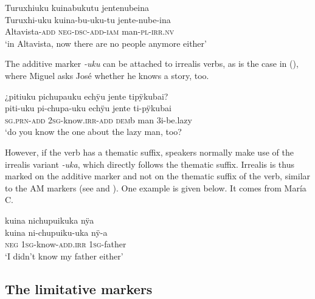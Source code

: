 \ea\label{ex:ADD-nonverbal}
\begingl
\glpreamble Turuxhiuku kuinabukutu jentenubeina\\
\gla Turuxhi-uku kuina-bu-uku-tu jente-nube-ina\\
\glb Altavista-\textsc{add} \textsc{neg}-\textsc{dsc}-\textsc{add}-\textsc{iam} man-\textsc{pl}-\textsc{irr.nv}\\
\glft ‘in Altavista, now there are no people anymore either’
\endgl
\trailingcitation{[mty-p110906l.170]}
\xe

The additive marker \textit{-uku} can be attached to irrealis verbs, as is the case in (), where Miguel asks José whether he knows a story, too.

\ea\label{ex:know-too}
\begingl
\glpreamble ¿pitiuku pichupauku echÿu jente tipÿkubai?\\
\gla piti-uku pi-chupa-uku echÿu jente ti-pÿkubai\\
\textsc{sg.prn}-\textsc{add} 2\textsc{sg}-know.\textsc{irr}-\textsc{add} \textsc{dem}b man 3i-be.lazy\\
\glft ‘do you know the one about the lazy man, too?
\endgl
\trailingcitation{[mox-n110920l.001]}
\xe

However, if the verb has a thematic suffix, speakers normally make use of the irrealis variant \textit{-uka}, which directly follows the thematic suffix. Irrealis is thus marked on the additive marker and not on the thematic suffix of the verb, similar to the AM markers (see  and ). One example is given below. It comes from María C.

\ea\label{ex:ADD-IRR-2}
\begingl
\glpreamble kuina nichupuikuka nÿa\\
\gla kuina ni-chupuiku-uka nÿ-a\\
\glb \textsc{neg} 1\textsc{sg}-know-\textsc{add.irr} 1\textsc{sg}-father\\
\glft ‘I didn’t know my father either’
\endgl
\trailingcitation{[ump-p110815sf.148]}
\xe{} 

\subsection{The limitative markers}\label{sec:Limitatives}

